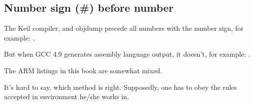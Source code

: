 ﻿

\subsection{Number sign (\#) before number}

The Keil compiler, \IDA and objdump precede all numbers with the \q{\#} number sign, for example:
.

But when GCC 4.9 generates assembly language output, it doesn't, for example: 
.

The ARM listings in this book are somewhat mixed.

It's hard to say, which method is right.
Supposedly, one has to obey the rules accepted in environment he/she works in.




